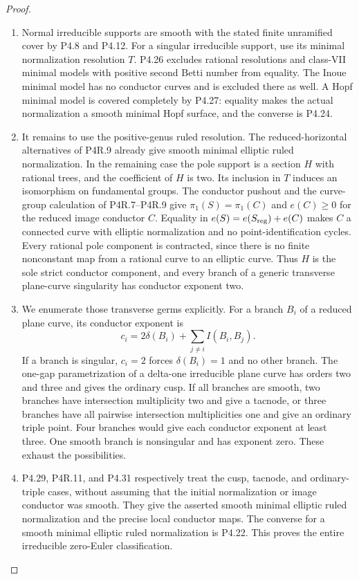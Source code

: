 \begin{proof}

\begin{enumerate}[label={$\langle1\rangle$\arabic*.},leftmargin=*]
\item Normal irreducible supports are smooth with the stated finite
unramified cover by P4.8 and P4.12. For a singular irreducible
support, use its minimal normalization resolution $T$.
P4.26 excludes rational resolutions and class-VII minimal
models with positive second Betti number from equality.
The Inoue minimal model has no conductor curves and is
excluded there as well. A Hopf minimal model is covered
completely by P4.27: equality makes the actual normalization
a smooth minimal Hopf surface, and the converse is P4.24.

\item It remains to use the positive-genus ruled resolution.
The reduced-horizontal alternatives of P4R.9 already give
smooth minimal elliptic ruled normalization. In the remaining
case the pole support is a section $H$ with rational trees,
and the coefficient of $H$ is two. Its inclusion in $T$
induces an isomorphism on fundamental groups. The conductor
pushout and the curve-group calculation of P4R.7--P4R.9 give
$\pi_1(S)=\pi_1(C)$ and $e(C)\ge0$ for the reduced image
conductor $C$. Equality in
$e(S)=e(S_{\rm reg})+e(C)$ makes $C$ a connected curve
with elliptic normalization and no point-identification
cycles. Every rational pole component is contracted, since
there is no finite nonconstant map from a rational curve
to an elliptic curve. Thus $H$ is the sole strict conductor
component, and every branch of a generic transverse
plane-curve singularity has conductor exponent two.

\item We enumerate those transverse germs explicitly. For a branch
$B_i$ of a reduced plane curve, its conductor exponent is
\[
 c_i=2\delta(B_i)+\sum_{j\ne i}I(B_i,B_j).
\]
If a branch is singular, $c_i=2$ forces
$\delta(B_i)=1$ and no other branch. The one-gap
parametrization of a delta-one irreducible plane curve
has orders two and three and gives the ordinary cusp.
If all branches are smooth, two branches have intersection
multiplicity two and give a tacnode, or three branches
have all pairwise intersection multiplicities one and
give an ordinary triple point. Four branches would give
each conductor exponent at least three. One smooth branch
is nonsingular and has exponent zero. These exhaust the
possibilities.

\item P4.29, P4R.11, and P4.31 respectively treat the cusp,
tacnode, and ordinary-triple cases, without assuming that
the initial normalization or image conductor was smooth.
They give the asserted smooth minimal elliptic ruled
normalization and the precise local conductor maps.
The converse for a smooth minimal elliptic ruled
normalization is P4.22. This proves the entire irreducible
zero-Euler classification.


\end{enumerate}
\end{proof}

